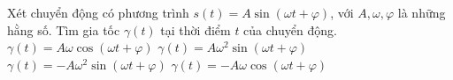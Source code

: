 

\begin{ex}%
	Xét chuyển động có phương trình $s(t)=A\sin \left(\omega  t+\varphi \right)$, với $A,\omega,\varphi $ là những hằng số. Tìm gia tốc $\gamma(t)$ tại thời điểm $t$ của chuyển động.
	\choice 
		 {$\gamma (t)=A\omega \cos \left(\omega t+\varphi \right)$}
		{$\gamma (t)=A\omega^2\sin  \left(\omega t+\varphi \right)$}
		{\True $\gamma (t)=-A\omega^2\sin \left(\omega t+\varphi \right)$} 
		{$\gamma (t)=-A\omega  \cos \left(\omega t+\varphi \right)$}
\end{ex}



